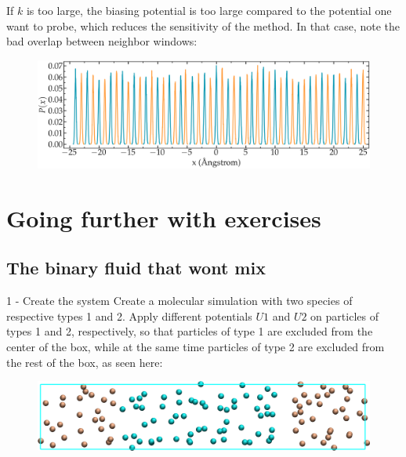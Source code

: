 If $k$ is too large, the biasing potential is too large 
compared to the potential one want to probe, which reduces the 
sensitivity of the method. In that case, note the bad overlap between neighbor windows:

\begin{figure}
\includegraphics[width=\linewidth]{tutorials/level3/free-energy-calculation/overlap15-light.png}
\end{figure}

\section{Going further with exercises}

\noindent \subsection{The binary fluid that wont mix}

1 - Create the system\textit{}
Create a molecular simulation with two species of respective types 1 and 2.
Apply different potentials $U1$ and $U2$ on particles of types 1 and 2, respectively,
so that particles of type 1 are excluded from the center of the box, while at the same time particles
of type 2 are excluded from the rest of the box, as seen here:

\begin{figure}
\includegraphics[width=\linewidth]{tutorials/level3/free-energy-calculation/exercice2-light.png}
\end{figure}

